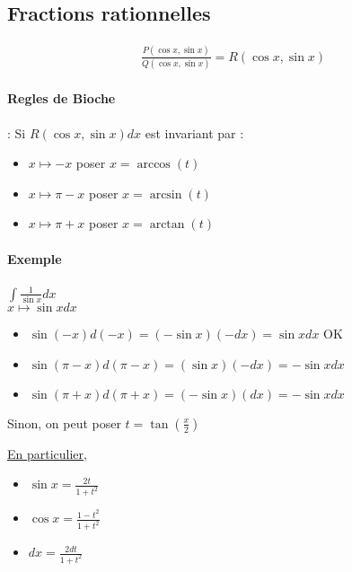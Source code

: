 \subsection{Fractions rationnelles}

\[\begin{array}{c}
	\frac{P(\cos x, \sin x)}{Q(\cos x, \sin x)} = R(\cos x, \sin x) \end{array}\]

\paragraph{Regles de Bioche} : Si $R(\cos x, \sin x) dx$ est invariant par : \begin{itemize}
\item $x \mapsto -x$ poser $x = \arccos (t)$ 
\item $x \mapsto \pi - x$ poser $x = \arcsin (t)$
\item $x \mapsto \pi + x$ poser $x = \arctan (t)$

\end{itemize}

\paragraph{Exemple} $\int \frac{1}{\sin x} dx$ ~\\
$x \mapsto \sin x dx$

\begin{itemize}
	\item $\sin(-x)d(-x) = (-\sin x)(-dx) = \sin x dx$ OK
	\item $\sin(\pi -x)d(\pi - x) = (\sin x)(-dx) = -\sin x dx$
	\item $\sin(\pi + x)d(\pi + x) = (-\sin x)(dx) = -\sin x dx$
\end{itemize}

Sinon, on peut poser $t = \tan (\frac{x}{2})$

\ul{En particulier}, \begin{itemize}
\item $\sin x = \frac{2t}{1+t^2}$ 
\item $\cos x = \frac{1-t^2}{1+t^2}$
\item $dx = \frac{2dt}{1+t^2}$
\end{itemize}

